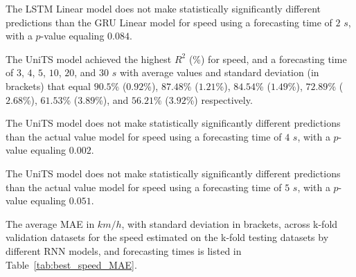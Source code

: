 The LSTM Linear model does not make statistically significantly different predictions than the GRU Linear model for speed using a forecasting time of $2$ $s$, with a $p$-value equaling $0.084$.

The UniTS model achieved the highest $R^{2}$ (\%) for speed, and a forecasting time of $3$, $4$, $5$, $10$, $20$, and $30$ $s$ with average values and standard deviation (in brackets) that equal $90.5$\% ($0.92$\%), $87.48$\% ($1.21$\%), $84.54$\% ($1.49$\%), $72.89$\% ($2.68$\%), $61.53$\% ($3.89$\%), and $56.21$\% ($3.92$\%) respectively.

The UniTS model does not make statistically significantly different predictions than the actual value model for speed using a forecasting time of $4$ $s$, with a $p$-value equaling $0.002$.

The UniTS model does not make statistically significantly different predictions than the actual value model for speed using a forecasting time of $5$ $s$, with a $p$-value equaling $0.051$.

The average MAE in $km/h$, with standard deviation in brackets, across k-fold validation datasets for the speed estimated on the k-fold testing datasets by different RNN models, and forecasting times is listed in Table~\ref{tab:best_speed_MAE}.

\begin{table}[!ht]
	\centering
	\caption{The average MAE in $km/h$, with standard deviation in brackets, across k-fold validation datasets for the speed estimated on the k-fold testing datasets by different RNN models, and forecasting times.}
	\label{tab:best_speed_MAE}
\end{table}

